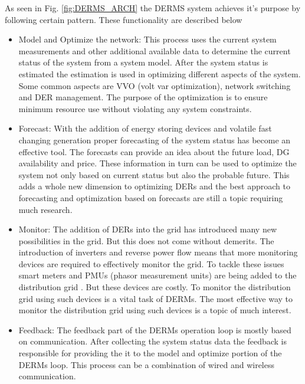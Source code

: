 As seen in Fig. \ref{fig:DERMS_ARCH} the DERMS system achieves it's purpose by following certain pattern. These functionality are described below

\begin{itemize}
    \item Model and Optimize the network: This process uses the current system measurements and other additional available data to determine the current status of the system from a system model. After the system status is estimated the estimation is used in optimizing different aspects of the system. Some common aspects are VVO (volt var optimization), network switching and DER management. The purpose of the optimization is to ensure minimum resource use without violating any system constraints.
    
    \item Forecast: With the addition of energy storing devices and volatile fast changing generation proper forecasting of the system status has become an effective tool. The forecasts can provide an idea about the  future load, DG availability and price. These information in turn can be used to optimize the system not only based on current status but also the probable future. This adds a whole new dimension to optimizing DERs and the best approach to forecasting and optimization based on forecasts are still a topic requiring much research.
    
    \item Monitor: The addition of DERs into the grid has introduced many new possibilities in the grid. But this does not come without demerits. The introduction of inverters and reverse power flow means that more monitoring devices are required to effectively monitor the grid. To tackle these issues smart meters and PMUs (phasor measurement units) are being added to the distribution grid \cite{DPMU1}. But these devices are costly. To monitor the distribution grid using such devices is a vital task of DERMs. The most effective way to monitor the distribution grid using such devices is a topic of much interest.
    
    \item Feedback: The feedback part of the DERMs operation loop is mostly based on communication. After collecting the system status data the feedback is responsible for providing the it to the model and optimize portion of the DERMs loop. This process can be a combination of wired and wireless communication.
\end{itemize}

